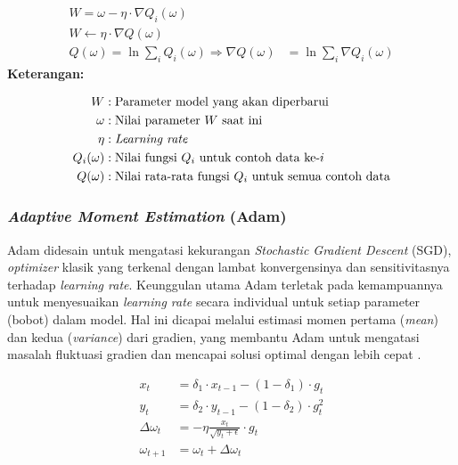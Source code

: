 \begin{equation}
\begin{aligned}
    W = \omega - \eta \cdot \nabla Q_i(\omega) \\
    W \leftarrow \eta \cdot \nabla Q(\omega) \\
    Q(\omega) = \ln \sum_i Q_i(\omega) 
    \Rightarrow \nabla Q(\omega) &= \ln \sum_i \nabla Q_i(\omega)
\end{aligned}
\label{Stochastic Gradient Descent}
\end{equation}
     \textbf{Keterangan:}
     
     \begin{align*}
    W & : \text{Parameter model yang akan diperbarui} \\
    \omega & : \text{Nilai parameter } W \text{ saat ini} \\
    \eta & : \text{\textit{Learning rate}} \\
    Q_i(\omega) & : \text{Nilai fungsi } Q_i \text{ untuk contoh data ke-}i \\
    Q(\omega) & : \text{Nilai rata-rata fungsi } Q_i \text{ untuk semua contoh data}
\end{align*}


    

\subsubsection{\textit{Adaptive Moment Estimation} (Adam)}
Adam didesain untuk mengatasi kekurangan \textit{Stochastic Gradient Descent} (SGD), \textit{optimizer} klasik yang terkenal dengan lambat konvergensinya dan sensitivitasnya terhadap \textit{learning rate}.  Keunggulan utama Adam terletak pada kemampuannya untuk menyesuaikan \textit{learning rate} secara individual untuk setiap parameter (bobot) dalam model.  Hal ini dicapai melalui estimasi momen pertama (\textit{mean}) dan kedua (\textit{variance}) dari gradien, yang membantu Adam untuk mengatasi masalah fluktuasi gradien dan mencapai solusi optimal dengan lebih cepat \cite{miranda2020convolutional}.

    \begin{equation}
    \begin{aligned}
        x_t &= \delta_1 \cdot x_{t-1} - (1 - \delta_1) \cdot g_t \\
        y_t &= \delta_2 \cdot y_{t-1} - (1 - \delta_2) \cdot g_t^2 \\
        \Delta \omega_t &= -\eta \frac{x_t}{\sqrt{y_t + \epsilon}} \cdot g_t \\
        \omega_{t+1} &= \omega_t + \Delta \omega_t
    \end{aligned}
    \label{Adam}
    \end{equation}

